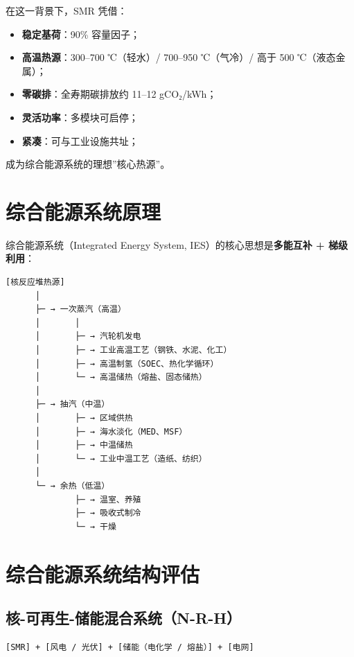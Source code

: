 \documentclass[
  UTF8,
  scheme=plain,
  fontsize=10pt,
  openany
]{ctexbook}
\begin{document}
在这一背景下，SMR 凭借：

\begin{itemize}
\tightlist
\item
  \textbf{稳定基荷}：90\% 容量因子；
\item
  \textbf{高温热源}：300--700 ℃（轻水）/ 700--950 ℃（气冷）/ 高于 500
  ℃（液态金属）；
\item
  \textbf{零碳排}：全寿期碳排放约 11--12 gCO₂/kWh；
\item
  \textbf{灵活功率}：多模块可启停；
\item
  \textbf{紧凑}：可与工业设施共址；
\end{itemize}

成为综合能源系统的理想''核心热源''。

\section{综合能源系统原理}\label{ux7efcux5408ux80fdux6e90ux7cfbux7edfux539fux7406}

综合能源系统（Integrated Energy System,
IES）的核心思想是\textbf{多能互补 + 梯级利用}：

\begin{verbatim}[核反应堆热源]
      │
      ├─ → 一次蒸汽（高温）
      │       │
      │       ├─ → 汽轮机发电
      │       ├─ → 工业高温工艺（钢铁、水泥、化工）
      │       ├─ → 高温制氢（SOEC、热化学循环）
      │       └─ → 高温储热（熔盐、固态储热）
      │
      ├─ → 抽汽（中温）
      │       ├─ → 区域供热
      │       ├─ → 海水淡化（MED、MSF）
      │       ├─ → 中温储热
      │       └─ → 工业中温工艺（造纸、纺织）
      │
      └─ → 余热（低温）
              ├─ → 温室、养殖
              ├─ → 吸收式制冷
              └─ → 干燥\end{verbatim}

\section{综合能源系统结构评估}\label{ux7efcux5408ux80fdux6e90ux7cfbux7edfux7ed3ux6784ux8bc4ux4f30}

\subsection{核-可再生-储能混合系统（N-R-H）}\label{ux6838-ux53efux518dux751f-ux50a8ux80fdux6df7ux5408ux7cfbux7edfn-r-h}

\begin{verbatim}[SMR] + [风电 / 光伏] + [储能（电化学 / 熔盐）] + [电网]\end{verbatim}
\end{document}
